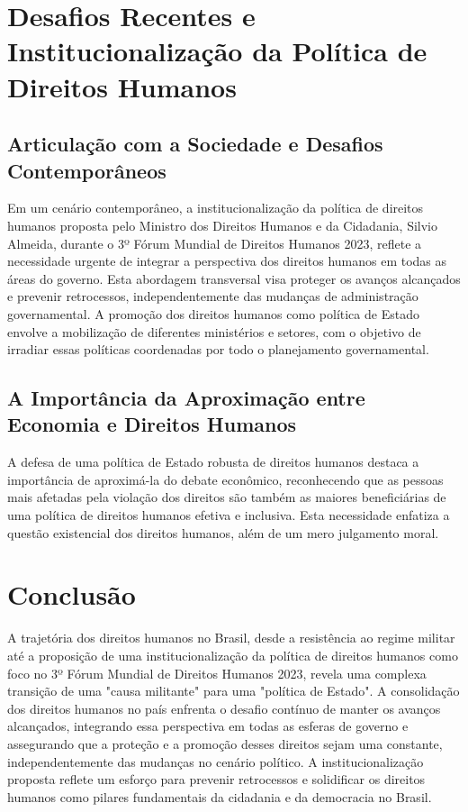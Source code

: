 \documentclass[
   article,       
   12pt,          
   oneside,       
   a4paper,       
   english,       
   brazil,        
   sumario=tradicional
   ]{abntex2}
\begin{document}
\section{Desafios Recentes e Institucionalização da Política de Direitos Humanos}

\subsection{Articulação com a Sociedade e Desafios Contemporâneos}

Em um cenário contemporâneo, a institucionalização da política de direitos humanos proposta pelo Ministro dos Direitos Humanos e da Cidadania, Silvio Almeida, durante o 3º Fórum Mundial de Direitos Humanos 2023, reflete a necessidade urgente de integrar a perspectiva dos direitos humanos em todas as áreas do governo. Esta abordagem transversal visa proteger os avanços alcançados e prevenir retrocessos, independentemente das mudanças de administração governamental. A promoção dos direitos humanos como política de Estado envolve a mobilização de diferentes ministérios e setores, com o objetivo de irradiar essas políticas coordenadas por todo o planejamento governamental.

\subsection{A Importância da Aproximação entre Economia e Direitos Humanos}

A defesa de uma política de Estado robusta de direitos humanos destaca a importância de aproximá-la do debate econômico, reconhecendo que as pessoas mais afetadas pela violação dos direitos são também as maiores beneficiárias de uma política de direitos humanos efetiva e inclusiva. Esta necessidade enfatiza a questão existencial dos direitos humanos, além de um mero julgamento moral.

\section{Conclusão}

A trajetória dos direitos humanos no Brasil, desde a resistência ao regime militar até a proposição de uma institucionalização da política de direitos humanos como foco no 3º Fórum Mundial de Direitos Humanos 2023, revela uma complexa transição de uma "causa militante" para uma "política de Estado". A consolidação dos direitos humanos no país enfrenta o desafio contínuo de manter os avanços alcançados, integrando essa perspectiva em todas as esferas de governo e assegurando que a proteção e a promoção desses direitos sejam uma constante, independentemente das mudanças no cenário político. A institucionalização proposta reflete um esforço para prevenir retrocessos e solidificar os direitos humanos como pilares fundamentais da cidadania e da democracia no Brasil.

                                
\postextual

\end{document}
